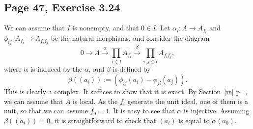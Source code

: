 \documentclass[parskip=half,fontsize=12pt]{scrartcl}%
\newcommand{\xr}{\xrightarrow}
\begin{document}
\subsection{Page 47, Exercise 3.24}%

We can assume that $I$ is nonempty, and that $0\in I$. Let $\alpha_i:A\to A_{f_i}$ and $\phi_{ij}:A_{f_i}\to A_{f_if_j}$ be the natural morphisms, and consider the diagram 
$$
0\to A\xr\alpha\prod_{i\in I}A_{f_i}\xr\beta\prod_{i,j\in I}A_{f_if_j},
$$ 
where $\alpha$ is induced by the $\alpha_i$ and $\beta$ is defined by 
$$
\beta((a_i)):=(\phi_{ij}(a_i)-\phi_{ji}(a_j)).
$$
This is clearly a complex. It suffices to show that it is exact. By Section~\ref{re} p.~\pageref{re}, we can assume that $A$ is local. As the $f_i$ generate the unit ideal, one of them is a unit, so that we can assume $f_0=1$. It is easy to see that $\alpha$ is injective. Assuming $\beta((a_i))=0$, it is straightforward to check that $(a_i)$ is equal to $\alpha(a_0)$.
\end{document}
